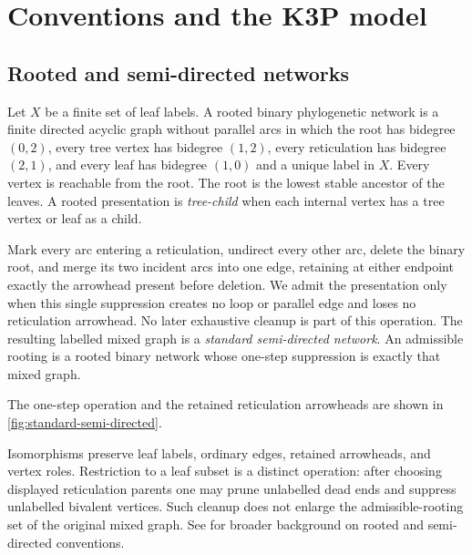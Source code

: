 \section{Conventions and the K3P model}\label{sec:conventions}

\subsection{Rooted and semi-directed networks}

\begin{definition}
Let \(X\) be a finite set of leaf labels.  A rooted binary phylogenetic
network is a finite directed acyclic graph without parallel arcs in which the
root has bidegree \((0,2)\), every tree vertex has bidegree \((1,2)\), every
reticulation has bidegree \((2,1)\), and every leaf has bidegree \((1,0)\) and
a unique label in \(X\).  Every vertex is reachable from the root.  The root
is the lowest stable ancestor of the leaves.  A rooted presentation is
\emph{tree-child} when each internal vertex has a tree vertex or leaf as a
child.
\end{definition}

\begin{definition}\label{def:standard}
Mark every arc entering a reticulation, undirect every other arc, delete the
binary root, and merge its two incident arcs into one edge, retaining at
either endpoint exactly the arrowhead present before deletion.  We admit the
presentation only when this single suppression creates no loop or parallel
edge and loses no reticulation arrowhead.  No later exhaustive cleanup is
part of this operation.  The resulting labelled mixed graph is a
\emph{standard semi-directed network}.  An admissible rooting is a rooted
binary network whose one-step suppression is exactly that mixed graph.
\end{definition}



The one-step operation and the retained reticulation arrowheads are shown in
\cref{fig:standard-semi-directed}.

Isomorphisms preserve leaf labels, ordinary edges, retained arrowheads, and
vertex roles.  Restriction to a leaf subset is a distinct operation: after
choosing displayed reticulation parents one may prune unlabelled dead ends
and suppress unlabelled bivalent vertices.  Such cleanup does not enlarge the
admissible-rooting set of the original mixed graph.  See
\cite{SempleSteel2003,HoltgrefeEtAl2026} for broader background on rooted and
semi-directed conventions.

